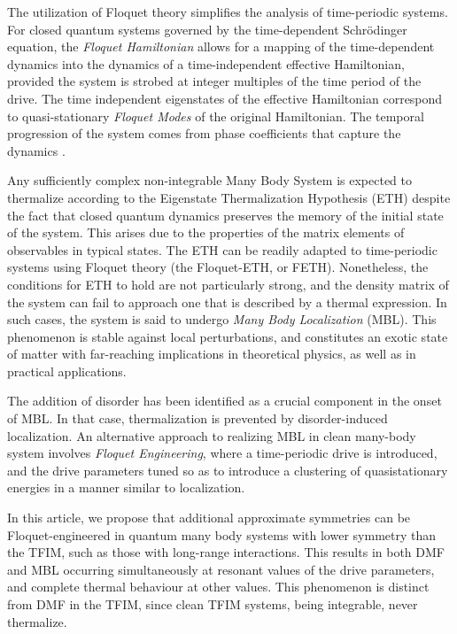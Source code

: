 \documentclass[%
reprint,
superscriptaddress,
amsmath,amssymb,
aps,
prb,
showkeys,
]{revtex4-2}
\begin{document}
	The utilization of Floquet theory simplifies the analysis of time-periodic systems. For closed quantum systems governed by the time-dependent Schr\"odinger equation, the \textit{Floquet Hamiltonian} allows for a mapping 
of the time-dependent dynamics into the dynamics of 	
a time-independent effective Hamiltonian, provided the system is strobed at integer multiples of the time period of the drive. The time independent eigenstates of the effective Hamiltonian correspond to quasi-stationary \textit{Floquet Modes} of the original Hamiltonian. The temporal progression of the system comes from  phase coefficients that capture the dynamics \cite{li_floquet_2018,eckardt_high_frequency_2015}.	
	
	Any sufficiently complex non-integrable Many Body System is expected to thermalize according to the Eigenstate Thermalization Hypothesis (ETH) despite the fact that closed quantum dynamics preserves the memory of the initial state of the system. This arises due to the properties of the matrix elements of observables 
	in typical states\cite{zhang_floquet_2016}. The ETH can be readily adapted to time-periodic systems using Floquet theory (the Floquet-ETH, or FETH). Nonetheless, the conditions for ETH to hold are not particularly strong, and the density matrix of the system can fail to approach one that is described by a thermal expression. In such cases, the system is said to undergo \textit{Many Body Localization} (MBL)\cite{khemani_phase_2016}. This phenomenon is stable against local perturbations, and constitutes an exotic state of matter with far-reaching implications in theoretical physics, as well as in practical applications\cite{yunger_halpern_quantum_2019}.
	
	The addition of disorder has been identified as a crucial component in the onset of MBL. In that case, thermalization is prevented by disorder-induced localization. An alternative approach to realizing MBL in clean many-body system involves \textit{Floquet Engineering}, where a time-periodic drive is introduced, and the drive parameters tuned so as to introduce a clustering of quasistationary energies in a manner similar to localization\cite{zhang_floquet_2016}.
	

	
	In this article, we propose that additional approximate symmetries can be Floquet-engineered in quantum many body systems with lower symmetry than the TFIM, such as those with long-range interactions. This results in both DMF and MBL occurring simultaneously at resonant values of the drive parameters, and complete thermal behaviour at other values. This phenomenon is distinct from DMF in the TFIM, since clean TFIM systems, being integrable, never thermalize.
	
\end{document}
